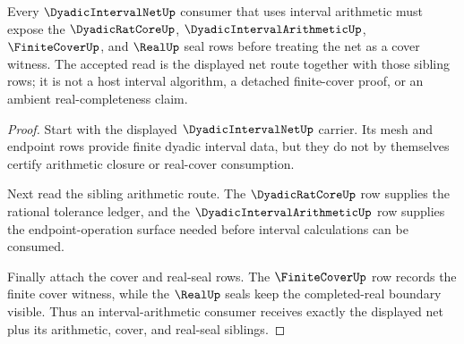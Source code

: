 \begin{theorem}
\label{thm:dyadic-interval-net-interval-arithmetic-sibling-route}
Every $\DyadicIntervalNetUp$ consumer that uses interval arithmetic must expose the $\DyadicRatCoreUp$, $\DyadicIntervalArithmeticUp$, $\FiniteCoverUp$, and $\RealUp$ seal rows before treating the net as a cover witness. The accepted read is the displayed net route together with those sibling rows; it is not a host interval algorithm, a detached finite-cover proof, or an ambient real-completeness claim.
\end{theorem}
\begin{proof}
Start with the displayed $\DyadicIntervalNetUp$ carrier. Its mesh and endpoint rows provide finite dyadic interval data, but they do not by themselves certify arithmetic closure or real-cover consumption.

Next read the sibling arithmetic route. The $\DyadicRatCoreUp$ row supplies the rational tolerance ledger, and the $\DyadicIntervalArithmeticUp$ row supplies the endpoint-operation surface needed before interval calculations can be consumed.

Finally attach the cover and real-seal rows. The $\FiniteCoverUp$ row records the finite cover witness, while the $\RealUp$ seals keep the completed-real boundary visible. Thus an interval-arithmetic consumer receives exactly the displayed net plus its arithmetic, cover, and real-seal siblings.
\end{proof}
